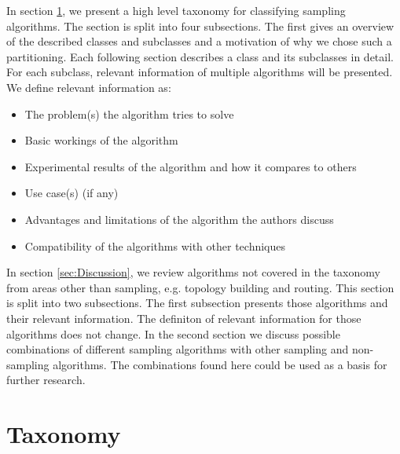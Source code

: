   In section \ref{sec:Taxonomy}, we present a
high level taxonomy for classifying sampling algorithms. The section is split
into four subsections. The first gives an overview of the described classes and
subclasses and a motivation of why we chose such a partitioning. Each following
section describes a class and its subclasses in detail. For each subclass,
relevant information of multiple algorithms will be presented. We define
relevant information as:
\begin{itemize}
	\item The problem(s) the algorithm tries to solve
	\item Basic workings of the algorithm
	\item Experimental results of the algorithm and how it compares to others
	\item Use case(s) (if any)
	\item Advantages and limitations of the algorithm the authors discuss
	\item Compatibility of the algorithms with other techniques
\end{itemize}   


 In section \ref{sec:Discussion}, we review
algorithms not covered in the taxonomy from areas other than sampling, e.g.
topology building and routing. This section is split into two subsections. The
first subsection presents those algorithms and their relevant information. The
definiton of relevant information for those algorithms does not change. In the
second section we discuss possible combinations of different sampling
algorithms with other sampling and non-sampling algorithms. The combinations
found here could be used as a basis for further research.


\section{Taxonomy}
\label{sec:Taxonomy}

